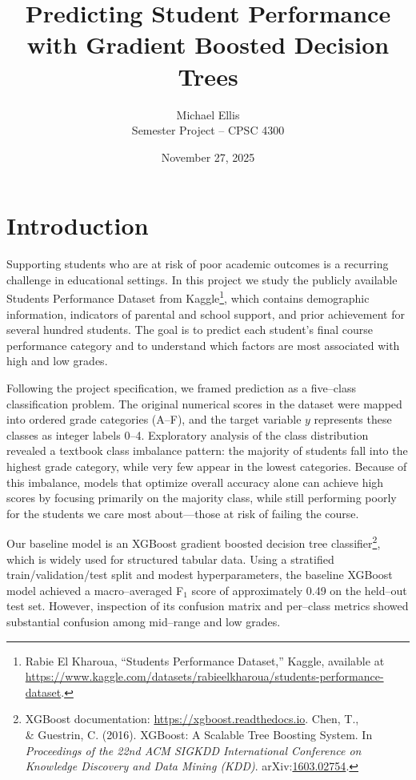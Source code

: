 \documentclass[11pt]{article}
\title{Predicting Student Performance with Gradient Boosted Decision Trees}
\author{Michael Ellis \\ Semester Project -- CPSC 4300}
\date{November 27, 2025}
\begin{document}
\maketitle

\section{Introduction}

Supporting students who are at risk of poor academic outcomes is a
recurring challenge in educational settings.  In this project we study
the publicly available Students Performance Dataset from Kaggle\footnote{Rabie El
Kharoua, ``Students Performance Dataset,'' Kaggle, available at \url{https://www.kaggle.com/datasets/rabieelkharoua/students-performance-dataset}.}, which
contains demographic information, indicators of parental and school
support, and prior achievement for several hundred students.  The goal
is to predict each student's final course performance category and to
understand which factors are most associated with high and low grades.

Following the project specification, we framed prediction as a
five--class classification problem.  The original numerical scores in
the dataset were mapped into ordered grade categories (A--F), and the
target variable $y$ represents these classes as integer labels
0--4.  Exploratory analysis of the class distribution revealed a
textbook class imbalance pattern: the majority of students fall into
the highest grade category, while very few appear in the lowest
categories.  Because of this imbalance, models that optimize overall
accuracy alone can achieve high scores by focusing primarily on the
majority class, while still performing poorly for the students we care
most about---those at risk of failing the course.

Our baseline model is an XGBoost gradient boosted decision tree
classifier\footnote{XGBoost documentation: \url{https://xgboost.readthedocs.io}. Chen, T., \\& Guestrin, C. (2016). XGBoost: A Scalable Tree Boosting System. In \emph{Proceedings of the 22nd ACM SIGKDD International Conference on Knowledge Discovery and Data Mining (KDD)}. arXiv:\href{https://arxiv.org/abs/1603.02754}{1603.02754}.}, which is widely used for structured tabular data.  Using a
stratified train/validation/test split and modest hyperparameters, the
baseline XGBoost model achieved a macro--averaged F$_1$ score of
approximately 0.49 on the held--out test set.  However, inspection of
its confusion matrix and per--class metrics showed substantial
confusion among mid--range and low grades.
\end{document}
